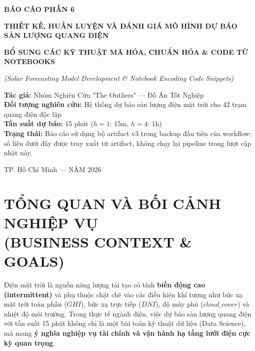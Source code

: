 \documentclass[12pt,a4paper]{article}
\begin{document}
\begin{titlepage}
    \centering
    \vspace*{1cm}

    {\Huge \bfseries BÁO CÁO PHẦN 6 \par}
    \vspace{0.5cm}
    {\huge \bfseries THIẾT KẾ, HUẤN LUYỆN VÀ ĐÁNH GIÁ MÔ HÌNH DỰ BÁO SẢN LƯỢNG QUANG ĐIỆN \par}
    \vspace{0.3cm}
    {\large \bfseries BỔ SUNG CÁC KỸ THUẬT MÃ HÓA, CHUẨN HÓA \& CODE TỪ NOTEBOOKS \par}
    \vspace{0.2cm}
    {\large \itshape (Solar Forecasting Model Development \& Notebook Encoding Code Snippets) \par}
    
    \vspace{1.5cm}
    \textbf{Tác giả:} Nhóm Nghiên Cứu "The Outliers" --- Đồ Án Tốt Nghiệp \\
    \textbf{Đối tượng nghiên cứu:} Hệ thống dự báo sản lượng điện mặt trời cho 42 trạm quang điện độc lập \\
    \textbf{Tần suất dự báo:} 15 phút ($h=1$: 15m, $h=4$: 1h) \\
    \textbf{Trạng thái:} Báo cáo sử dụng bộ artifact v3 trong backup đầu tiên của workflow; số liệu dưới đây được truy xuất từ artifact, không chạy lại pipeline trong lượt cập nhật này.
    
    \vfill
    {\large TP. Hồ Chí Minh --- NĂM 2026 \par}
\end{titlepage}


\tableofcontents
\newpage

\section[TỔNG QUAN VÀ BỐI CẢNH NGHIỆP VỤ]{TỔNG QUAN VÀ BỐI CẢNH NGHIỆP VỤ\\(BUSINESS CONTEXT \& GOALS)}

Điện mặt trời là nguồn năng lượng tái tạo có tính \textbf{biến động cao (intermittent)} và phụ thuộc chặt chẽ vào các điều kiện khí tượng như bức xạ mặt trời toàn phần ($GHI$), bức xạ trực tiếp ($DNI$), độ mây phủ ($cloud\_cover$) và nhiệt độ môi trường. Trong thực tế ngành điện, việc dự báo sản lượng quang điện với tần suất 15 phút không chỉ là một bài toán kỹ thuật dữ liệu (Data Science), mà mang \textbf{ý nghĩa nghiệp vụ tài chính và vận hành hạ tầng lưới điện cực kỳ quan trọng}.
\end{document}
